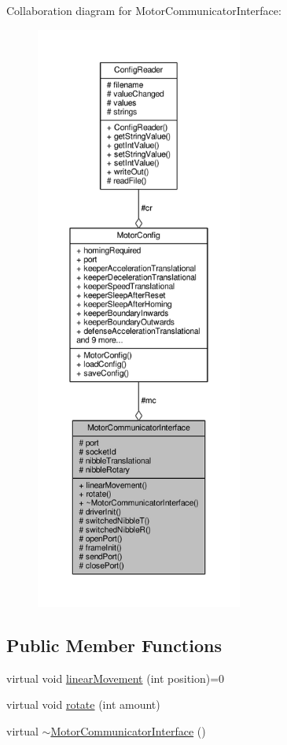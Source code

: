 Collaboration diagram for Motor\+Communicator\+Interface\+:\nopagebreak
\begin{figure}[H]
\begin{center}
\leavevmode
\includegraphics[height=550pt]{class_motor_communicator_interface__coll__graph}
\end{center}
\end{figure}
\subsection*{Public Member Functions}
\begin{DoxyCompactItemize}
\item 
virtual void \hyperlink{class_motor_communicator_interface_ac4621f673547a5c0b63207348cef69d3}{linear\+Movement} (int position)=0
\item 
virtual void \hyperlink{class_motor_communicator_interface_a9b80ed5df32b6a079326b71832353c41}{rotate} (int amount)
\item 
virtual \hyperlink{class_motor_communicator_interface_a12d122da47f6ba863e7a8f7c838155b8}{$\sim$\+Motor\+Communicator\+Interface} ()
\end{DoxyCompactItemize}

